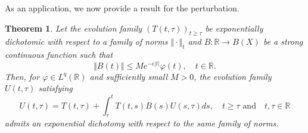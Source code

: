 \documentclass[reqno]{amsart}
\newtheorem{theorem}{Theorem}[section]
\def\r{\mathbb{R}}
\begin{document}
As an application, we now provide a result for the perturbation.
\begin{theorem}
Let the evolution family $(T(t,\tau))_{t\geq \tau}$ be exponentially dichotomic with respect to a family of norms $\Vert \cdot\Vert _t$ and  $B: \mathbb{R} \to B(X)$ be a strong continuous function such that 
\begin{equation}
\Vert B(t)\Vert \leq Me^{-\epsilon \vert t\vert}\varphi(t) ,\quad t \in \mathbb{R}. \label{2.24}
\end{equation}
Then, for $\varphi \in L^q(\r)$ and sufficiently small $M>0$, the evolution family $U(t,\tau)$ satisfying
$$U(t,\tau)=T(t,\tau)+ \displaystyle \int_{\tau}^t T(t,s)B(s)U(s,\tau)ds,\quad  t \geq \tau \text{ and}\quad t,\tau \in \mathbb{R} $$
admits an exponential dichotomy with respect to the same family of norms.
\end{theorem}
\end{document}
